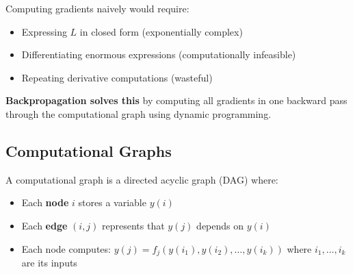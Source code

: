 \begin{notechapter}
Computing gradients naively would require:
\begin{itemize}
    \item Expressing $L$ in closed form (exponentially complex)
    \item Differentiating enormous expressions (computationally infeasible)
    \item Repeating derivative computations (wasteful)
\end{itemize}

\textbf{Backpropagation solves this} by computing all gradients in one backward pass through the computational graph using dynamic programming.

\subsection{Computational Graphs}

\begin{definition}
A computational graph is a directed acyclic graph (DAG) where:
\begin{itemize}
    \item Each \textbf{node} $i$ stores a variable $y(i)$
    \item Each \textbf{edge} $(i,j)$ represents that $y(j)$ depends on $y(i)$
    \item Each node computes: $y(j) = f_j(y(i_1), y(i_2), \ldots, y(i_k))$ where $i_1, \ldots, i_k$ are its inputs
\end{itemize}
\end{definition}

\begin{center}
\end{center}


\end{notechapter}
